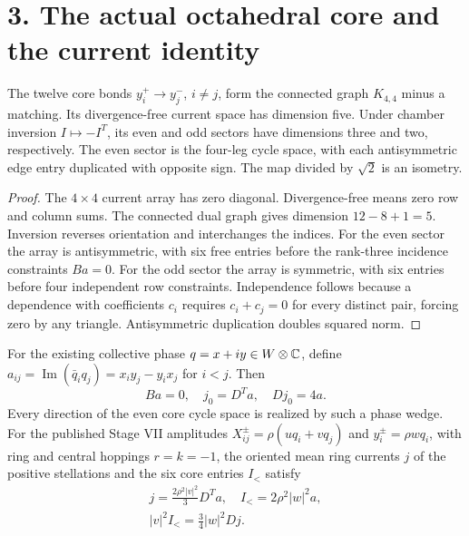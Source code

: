 \section*{3. The actual octahedral core and the current identity}
\begin{theorem}
The twelve core bonds $y_i^+\to y_j^-$, $i\ne j$, form the connected graph $K_{4,4}$ minus a matching. Its divergence-free current space has dimension five. Under chamber inversion $I\mapsto-I^T$, its even and odd sectors have dimensions three and two, respectively. The even sector is the four-leg cycle space, with each antisymmetric edge entry duplicated with opposite sign. The map divided by $\sqrt2$ is an isometry.
\end{theorem}
\begin{proof}
The $4\times4$ current array has zero diagonal. Divergence-free means zero row and column sums. The connected dual graph gives dimension $12-8+1=5$. Inversion reverses orientation and interchanges the indices. For the even sector the array is antisymmetric, with six free entries before the rank-three incidence constraints $Ba=0$. For the odd sector the array is symmetric, with six entries before four independent row constraints. Independence follows because a dependence with coefficients $c_i$ requires $c_i+c_j=0$ for every distinct pair, forcing zero by any triangle. Antisymmetric duplication doubles squared norm.
\end{proof}
\begin{theorem}
For the existing collective phase $q=x+iy\in W\otimes\mathbb C$, define $a_{ij}=\operatorname{Im}(\bar q_iq_j)=x_i y_j-y_i x_j$ for $i<j$. Then
\begin{equation}
 Ba=0,\quad j_0=D^Ta,\quad Dj_0=4a.
\end{equation}
Every direction of the even core cycle space is realized by such a phase wedge. For the published Stage VII amplitudes $X_{ij}^{\pm}=\rho(uq_i+vq_j)$ and $y_i^{\pm}=\rho wq_i$, with ring and central hoppings $r=k=-1$, the oriented mean ring currents $j$ of the positive stellations and the six core entries $I_{<}$ satisfy
\begin{equation}
 \begin{gathered}j=\frac{2\rho^2|v|^2}{3}D^Ta,\quad I_{<}=2\rho^2|w|^2 a,\\
 \boxed{|v|^2 I_{<}=\tfrac34 |w|^2 Dj.}\end{gathered}
\end{equation}
\end{theorem}
